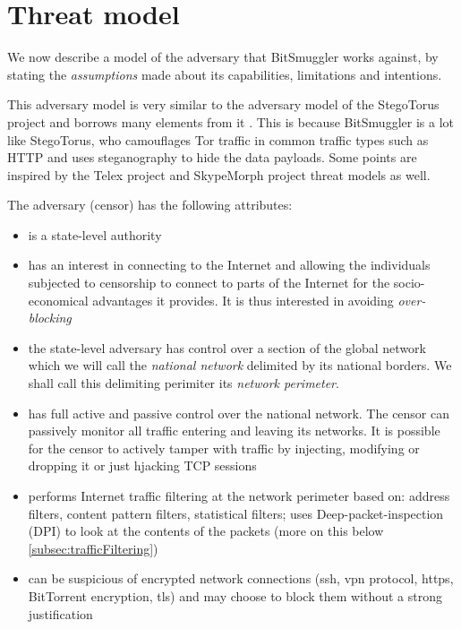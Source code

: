 \documentclass[11pt]{book} %
\newcommand{\projectName}{BitSmuggler }
\begin{document}
\newpage
\section{Threat model}
\label{sec:threatModel}

We now describe a model of the adversary that \projectName works against, by stating the \textit{assumptions} made about its capabilities, limitations and intentions.

This adversary model is very similar to the adversary model of the StegoTorus project  \citep*{stegotorus} and borrows many elements from it . This is because \projectName  is a lot like StegoTorus, who camouflages Tor traffic in common traffic types such as HTTP and uses steganography to hide the data payloads. Some points are inspired by the Telex project \citep*{telex11} and SkypeMorph project\citep*{skypeMorph} threat models as well.

The adversary (censor) has the following attributes:

\begin{itemize}
\item is a state-level authority
\item has an interest in connecting to the Internet and allowing the individuals subjected to censorship to connect to parts of the Internet for the socio-economical advantages it provides. It is thus interested in avoiding \textit{over-blocking}
\item the state-level adversary has control over a section of the global network which we will call the \textit{national network} delimited by its national borders. We shall call this delimiting perimiter its \textit{network perimeter}.
\item has full active and passive control over the national network. The censor can passively monitor all traffic entering and leaving its networks. It is possible for the censor to actively tamper with traffic by injecting, modifying or dropping it or just hjacking TCP sessions
\item performs Internet traffic filtering at the network perimeter based on: address filters, content pattern filters, statistical filters; uses Deep-packet-inspection (DPI) to look at the contents of the packets (more on this below \ref{subsec:trafficFiltering})

\item can be suspicious of encrypted network connections (ssh, vpn protocol, https, BitTorrent encryption, tls) and may choose to block them without a strong justification

\end{itemize}
\end{document}
